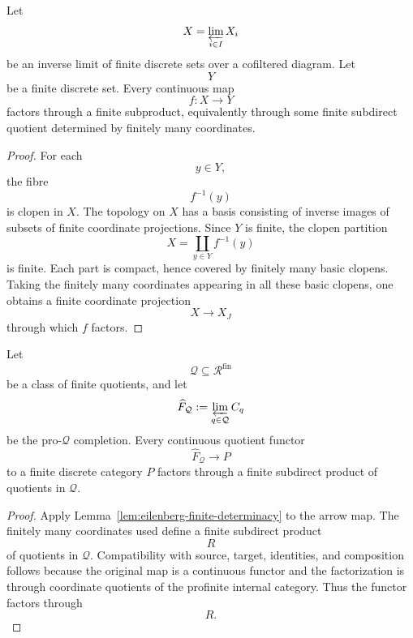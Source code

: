 \begin{lemma}
\label{lem:eilenberg-finite-determinacy}
Let
\[
X=\varprojlim_{i\in I}X_i
\]
be an inverse limit of finite discrete sets over a cofiltered diagram. Let
\[
Y
\]
be a finite discrete set. Every continuous map
\[
f:X\to Y
\]
factors through a finite subproduct, equivalently through some finite
subdirect quotient determined by finitely many coordinates.
\end{lemma}

\begin{proof}
For each
\[
y\in Y,
\]
the fibre
\[
f^{-1}(y)
\]
is clopen in \(X\). The topology on \(X\) has a basis consisting of inverse
images of subsets of finite coordinate projections. Since \(Y\) is finite,
the clopen partition
\[
X=\coprod_{y\in Y}f^{-1}(y)
\]
is finite. Each part is compact, hence covered by finitely many basic clopens.
Taking the finitely many coordinates appearing in all these basic clopens,
one obtains a finite coordinate projection
\[
X\to X_J
\]
through which \(f\) factors.
\end{proof}

\begin{proposition}
\label{prop:eilenberg-finite-maps-factor-subdirect}
Let
\[
\mathcal Q\subseteq\mathcal R^{\mathrm{fin}}
\]
be a class of finite quotients, and let
\[
\widehat F_{\mathcal Q}
:=
\varprojlim_{q\in\mathcal Q}C_q
\]
be the pro-\(\mathcal Q\) completion. Every continuous quotient functor
\[
\widehat F_{\mathcal Q}\to P
\]
to a finite discrete category \(P\) factors through a finite subdirect
product of quotients in \(\mathcal Q\).
\end{proposition}

\begin{proof}
Apply Lemma~\ref{lem:eilenberg-finite-determinacy} to the arrow map. The
finitely many coordinates used define a finite subdirect product
\[
R
\]
of quotients in \(\mathcal Q\). Compatibility with source, target, identities,
and composition follows because the original map is a continuous functor and
the factorization is through coordinate quotients of the profinite internal
category. Thus the functor factors through
\[
R.
\]
\end{proof}

